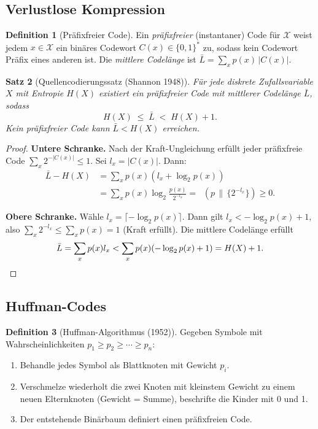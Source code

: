 \documentclass[12pt,a4paper]{amsart}
\newtheorem{theorem}{Satz}[section]
\theoremstyle{definition}
\newtheorem{definition}[theorem]{Definition}
\theoremstyle{remark}
\DeclareMathOperator{\KL}{D_{KL}}
\begin{document}
\subsection{Verlustlose Kompression}

\begin{definition}[Präfixfreier Code]
Ein \emph{präfixfreier} (instantaner) Code für $\mathcal{X}$ weist jedem
$x \in \mathcal{X}$ ein binäres Codewort $C(x) \in \{0,1\}^*$ zu, sodass kein
Codewort Präfix eines anderen ist. Die \emph{mittlere Codelänge} ist
$\bar{L} = \sum_x p(x)\,|C(x)|$.
\end{definition}

\begin{theorem}[Quellencodierungssatz (Shannon 1948)]\label{satz:quellencodierung}
Für jede diskrete Zufallsvariable $X$ mit Entropie $H(X)$ existiert ein
präfixfreier Code mit mittlerer Codelänge $\bar{L}$, sodass
\[
  H(X) \;\leq\; \bar{L} \;<\; H(X) + 1.
\]
Kein präfixfreier Code kann $\bar{L} < H(X)$ erreichen.
\end{theorem}
\begin{proof}
\textbf{Untere Schranke.} Nach der Kraft-Ungleichung erfüllt jeder präfixfreie
Code $\sum_x 2^{-|C(x)|} \leq 1$. Sei $l_x = |C(x)|$. Dann:
\begin{align*}
  \bar{L} - H(X) &= \sum_x p(x)(l_x + \log_2 p(x)) \\
  &= \sum_x p(x)\log_2\frac{p(x)}{2^{-l_x}}
   = \KL\!\left(p \,\Big\|\, \{2^{-l_x}\}\right) \geq 0.
\end{align*}

\textbf{Obere Schranke.} Wähle $l_x = \lceil -\log_2 p(x)\rceil$. Dann gilt
$l_x < -\log_2 p(x) + 1$, also $\sum_x 2^{-l_x} \leq \sum_x p(x) = 1$
(Kraft erfüllt). Die mittlere Codelänge erfüllt
\[
  \bar{L} = \sum_x p(x)l_x < \sum_x p(x)(-\log_2 p(x) + 1) = H(X) + 1. \qedhere
\]
\end{proof}

\subsection{Huffman-Codes}

\begin{definition}[Huffman-Algorithmus (1952)]
Gegeben Symbole mit Wahrscheinlichkeiten $p_1 \geq p_2 \geq \cdots \geq p_n$:
\begin{enumerate}
  \item Behandle jedes Symbol als Blattknoten mit Gewicht $p_i$.
  \item Verschmelze wiederholt die zwei Knoten mit kleinstem Gewicht zu einem
        neuen Elternknoten (Gewicht = Summe), beschrifte die Kinder mit 0 und 1.
  \item Der entstehende Binärbaum definiert einen präfixfreien Code.
\end{enumerate}
\end{definition}
\end{document}
